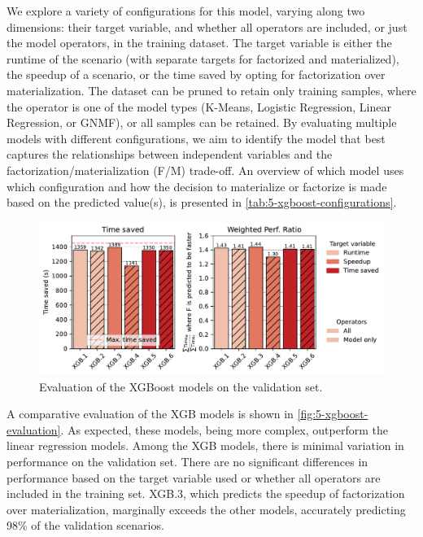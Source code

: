 We explore a variety of configurations for this model, varying along two dimensions: their target variable, and whether all operators are included, or just the model operators, in the training dataset. The target variable is either the runtime of the scenario (with separate targets for factorized and materialized), the speedup of a scenario, or the time saved by opting for factorization over materialization. The dataset can be pruned to retain only training samples, where the operator is one of the model types (K-Means, Logistic Regression, Linear Regression, or GNMF), or all samples can be retained. By evaluating multiple models with different configurations, we aim to identify the model that best captures the relationships between independent variables and the factorization/materialization (F/M) trade-off. An overview of which model uses which configuration and how the decision to materialize or factorize is made based on the predicted value(s), is presented in \autoref{tab:5-xgboost-configurations}.

\begin{figure}[ht]
    \centering
    \includegraphics[width=\linewidth]{chapters/05_cost_estimation/figures/xgb-models-compare.pdf}
    \caption[XGBoost model Comparison]{Evaluation of the XGBoost models on the validation set.}
    \label{fig:5-xgboost-evaluation}
\end{figure}

A comparative evaluation of the XGB models is shown in \autoref{fig:5-xgboost-evaluation}. As expected, these models, being more complex, outperform the linear regression models. Among the XGB models, there is minimal variation in performance on the validation set. There are no significant differences in performance based on the target variable used or whether all operators are included in the training set. XGB.3, which predicts the speedup of factorization over materialization, marginally exceeds the other models, accurately predicting 98\% of the validation scenarios.

